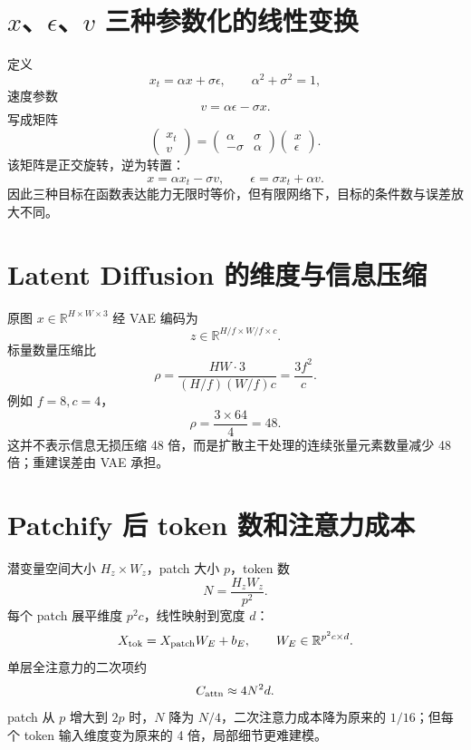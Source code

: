 \documentclass[UTF8,12pt,a4paper,fontset=none]{ctexart}
\numberwithin{equation}{section}
\newcommand{\R}{\mathbb{R}}
\begin{document}
\section{$x$、$\epsilon$、$v$ 三种参数化的线性变换}
定义
\begin{equation}
 x_t=\alpha x+\sigma\epsilon,
 \qquad \alpha^2+\sigma^2=1,
\end{equation}
速度参数
\begin{equation}
 v=\alpha\epsilon-\sigma x.
\end{equation}
写成矩阵
\begin{equation}
 \begin{pmatrix}x_t\\v\end{pmatrix}
 =\begin{pmatrix}\alpha&\sigma\\-\sigma&\alpha\end{pmatrix}
 \begin{pmatrix}x\\\epsilon\end{pmatrix}.
\end{equation}
该矩阵是正交旋转，逆为转置：
\begin{equation}
 x=\alpha x_t-\sigma v,
 \qquad
 \epsilon=\sigma x_t+\alpha v.
\end{equation}
因此三种目标在函数表达能力无限时等价，但有限网络下，目标的条件数与误差放大不同。

\section{Latent Diffusion 的维度与信息压缩}
原图 $x\in\R^{H\times W\times3}$ 经 VAE 编码为
\begin{equation}
 z\in\R^{H/f\times W/f\times c}.
\end{equation}
标量数量压缩比
\begin{equation}
 \rho=\frac{H W\cdot3}{(H/f)(W/f)c}
 =\frac{3f^2}{c}.
\end{equation}
例如 $f=8,c=4$，
\begin{equation}
 \rho=\frac{3\times64}{4}=48.
\end{equation}
这并不表示信息无损压缩 48 倍，而是扩散主干处理的连续张量元素数量减少 48 倍；重建误差由 VAE 承担。

\section{Patchify 后 token 数和注意力成本}
潜变量空间大小 $H_z\times W_z$，patch 大小 $p$，token 数
\begin{equation}
 N=\frac{H_zW_z}{p^2}.
\end{equation}
每个 patch 展平维度 $p^2c$，线性映射到宽度 $d$：
\begin{equation}
 X_{\rm tok}=X_{\rm patch}W_E+b_E,
 \qquad W_E\in\R^{p^2c\times d}.
\end{equation}
单层全注意力的二次项约
\begin{equation}
 C_{\rm attn}\approx4N^2d.
\end{equation}
patch 从 $p$ 增大到 $2p$ 时，$N$ 降为 $N/4$，二次注意力成本降为原来的 $1/16$；但每个 token 输入维度变为原来的 4 倍，局部细节更难建模。
\end{document}

